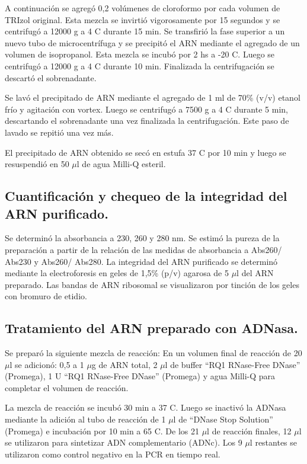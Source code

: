 A continuación se agregó 0,2 volúmenes de cloroformo por cada volumen de TRIzol original.
Esta mezcla se invirtió vigorosamente por 15 segundos y se centrifugó a 12000 g a 4 \degree C durante 15 min.
Se transfirió la fase superior a un nuevo tubo de microcentrífuga y se precipitó el ARN mediante el agregado de un volumen de isopropanol.
Esta mezcla se incubó por 2 hs a -20 \degree C. Luego se centrifugó a 12000 g a 4 \degree C durante 10 min.
Finalizada la centrifugación se descartó el sobrenadante.

Se lavó el precipitado de ARN mediante el agregado de 1 ml de 70\% (v/v) etanol frío y agitación con vortex.
Luego se centrifugó a 7500 g a 4 \degree C durante 5 min, descartando el sobrenadante una vez finalizada la centrifugación. 
Este paso de lavado se repitió una vez más.

El precipitado de ARN obtenido se secó en estufa 37 \degree C por 10 min y luego se resuspendió en 50 $\mu$l de agua Milli-Q esteril.

\subsection{Cuantificación y chequeo de la integridad del ARN purificado.}
Se determinó la absorbancia a 230, 260 y 280 nm. Se estimó la pureza de la preparación a partir de la relación de las medidas de absorbancia a Abs260/ Abs230 y Abs260/ Abs280.
La integridad del ARN purificado se determinó mediante la electroforesis en geles de 1,5\% (p/v) agarosa de 5 $\mu$l del ARN preparado. Las bandas de
ARN ribosomal se visualizaron por tinción de los geles con bromuro de etidio.

\subsection{Tratamiento del ARN preparado con ADNasa.}
Se preparó la siguiente mezcla de reacción:
En un volumen final de reacción de 20 $\mu$l se adicionó: 0,5 a 1 $\mu$g de ARN total, 2 $\mu$l de buffer ``RQ1 RNase-Free DNase'' (Promega), 1 U ``RQ1 RNase-Free DNase'' (Promega) y agua Milli-Q para completar el volumen de reacción.

La mezcla de reacción se incubó 30 min a 37 \degree C. Luego se inactivó la ADNasa mediante la adición al tubo de reacción de 1 $\mu$l de ``DNase Stop Solution'' (Promega) e incubación por 10 min a 65 \degree  C.
De los 21 $\mu$l de reacción finales, 12 $\mu$l se utilizaron para sintetizar ADN complementario (ADNc).
Los 9 $\mu$l restantes se utilizaron como control negativo en la PCR en tiempo real.


